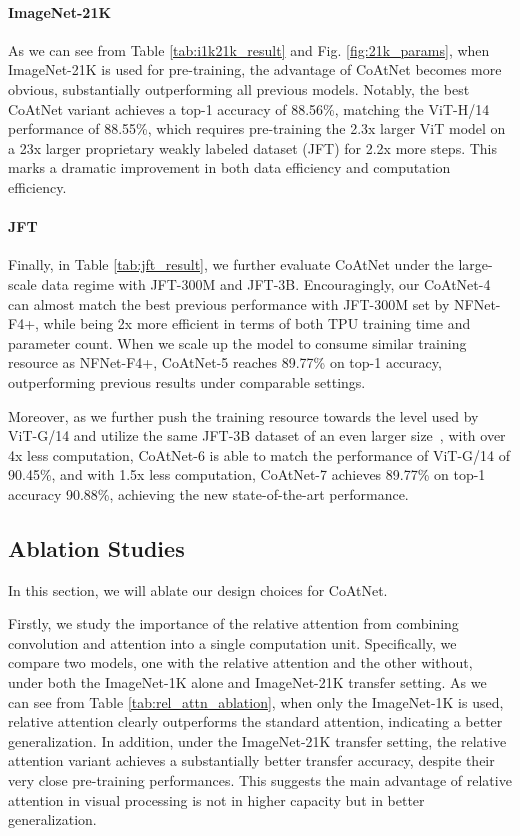 \documentclass{article}
\newcommand{\name}{CoAtNet\xspace}
\begin{document}
\paragraph{ImageNet-21K} As we can see from Table \ref{tab:i1k21k_result} and Fig. \ref{fig:21k_params}, when ImageNet-21K is used for pre-training, the advantage of \name becomes more obvious, substantially outperforming all previous models.
Notably, the best \name variant achieves a top-1 accuracy of 88.56\%, matching the ViT-H/14 performance of 88.55\%, which requires pre-training the 2.3x larger ViT model on a 23x larger proprietary weakly labeled dataset (JFT) for 2.2x more steps.
This marks a dramatic improvement in both data efficiency and computation efficiency.

\paragraph{JFT} Finally, in Table \ref{tab:jft_result}, we further evaluate \name under the large-scale data regime with JFT-300M and JFT-3B.
Encouragingly, our \name-4 can almost match the best previous performance with JFT-300M set by NFNet-F4+, while being 2x more efficient in terms of both TPU training time and parameter count.
When we scale up the model to consume similar training resource as NFNet-F4+, \name-5 reaches 89.77\% on top-1 accuracy, outperforming previous results under comparable settings.

Moreover, as we further push the training resource towards the level used by ViT-G/14 and utilize the same JFT-3B dataset of an even larger size~\cite{zhai2021scaling}, with over 4x less computation, CoAtNet-6 is able to match the performance of ViT-G/14 of 90.45\%, and with 1.5x less computation, CoAtNet-7 achieves 89.77\% on top-1 accuracy 90.88\%, achieving the new state-of-the-art performance.

\subsection{Ablation Studies}
\label{sec:ablation}
In this section, we will ablate our design choices for  \name.

Firstly, we study the importance of the relative attention from combining convolution and attention into a single computation unit.
Specifically, we compare two models, one with the relative attention and the other without, under both the ImageNet-1K alone and ImageNet-21K transfer setting.
As we can see from Table \ref{tab:rel_attn_ablation}, when only the ImageNet-1K is used, relative attention clearly outperforms the standard attention, indicating a better generalization.
In addition, under the ImageNet-21K transfer setting, the relative attention variant achieves a substantially better transfer accuracy, despite their very close pre-training performances.
This suggests the main advantage of relative attention in visual processing is not in higher capacity but in better generalization.
\end{document}
